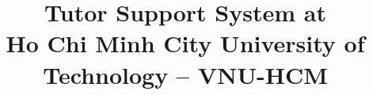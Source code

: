 \documentclass[twoside,final]{hcmut-report}
\title{Tutor Support System at \\ Ho Chi Minh City University of Technology – VNU-HCM}
\begin{document}
\coverpage%

\tableofcontents
\listoffigures

\newpage











\end{document}
